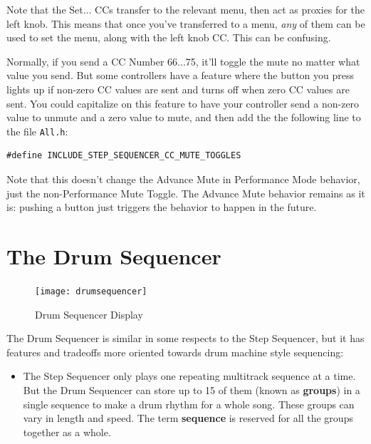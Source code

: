 \documentclass{article}
\begin{document}
\vspace{1em}
\noindent Note that the Set... CCs transfer to the relevant menu, then act as proxies for the left knob.  This means that once you've transferred to a menu, {\it any} of them can be used to set the menu, along with the left knob CC.  This can be confusing.

Normally, if you send a CC Number 66...75, it'll toggle the mute no matter what value you send.  But some controllers have a feature where the button you press lights up if non-zero CC values are sent and turns off when zero CC values are sent.  You could capitalize on this feature to have your controller send a non-zero value to unmute and a zero value to mute, and then add the the following line to the file {\tt All.h}:

\begin{verbatim}
#define INCLUDE_STEP_SEQUENCER_CC_MUTE_TOGGLES
\end{verbatim}

Note that this doesn't change the Advance Mute in Performance Mode behavior, just the non-Performance Mute Toggle.  The Advance Mute behavior remains as it is: pushing a button just triggers the behavior to happen in the future.

\clearpage



\section {The Drum Sequencer}
\label{drumsequencersec}

\vspace{1em}

\begin{figure}
\vspace{-3.5em}\texttt{[image: drumsequencer]}
\vspace{-1em}\caption{\small Drum Sequencer Display}\vspace{-2em}
\label{drumsequencer}
\end{figure}

The Drum Sequencer is similar in some respects to the Step Sequencer, but it has features and tradeoffs more oriented towards drum machine style sequencing:

\begin{itemize}
\item The Step Sequencer only plays one repeating multitrack sequence at a time.   But the Drum Sequencer can store up to 15 of them (known as {\bf groups}) in a single sequence to make a drum rhythm for a whole song.  These groups can vary in length and speed.  The term {\bf sequence} is reserved for all the groups together as a whole.
\end{itemize}
\end{document}
